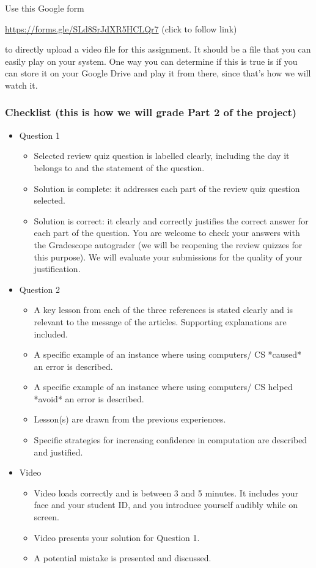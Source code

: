 Use this Google form

\url{https://forms.gle/SLd8SrJdXR5HCLQr7}  (click to follow link) 

to directly upload a video file for this assignment.
It should be a file that you can easily play on your system. 
One way you can determine if this is true is if you can store it on your Google Drive and play it from there,
since that's how we will watch it.

\subsubsection*{Checklist (this is how we will grade Part 2 of the project)}
\begin{itemize}
\item Question 1
    \begin{itemize}
        \item Selected review quiz question is labelled clearly, including the day 
        it belongs to and the statement of the question.
        \item Solution is complete: it addresses each part of the review quiz question selected.
        \item Solution is correct: it clearly and correctly justifies the correct answer 
        for each part of the question. You are welcome to check your answers with the 
        Gradescope autograder (we will be reopening the review quizzes for this purpose). 
        We will evaluate your submissions for the quality of your justification.
    \end{itemize}
\item Question 2
    \begin{itemize}
        \item A key lesson from each of the three references is stated clearly and 
        is relevant to the message of the articles. Supporting explanations are included.
        \item A specific example of an instance where using computers/ CS *caused* an error is described.
        \item A specific example of an instance where using computers/ CS helped *avoid* an error is described.
        \item Lesson(s) are drawn from the previous experiences.
        \item Specific strategies for increasing confidence in computation are described and justified.
    \end{itemize}
    \item Video
    \begin{itemize}
        \item Video loads correctly and is between 3 and 5 minutes. It includes your face and your student ID, 
        and you introduce yourself audibly while on screen.
        \item Video presents your solution for Question 1.
        \item A potential mistake is presented and discussed.
    \end{itemize}
\end{itemize}


